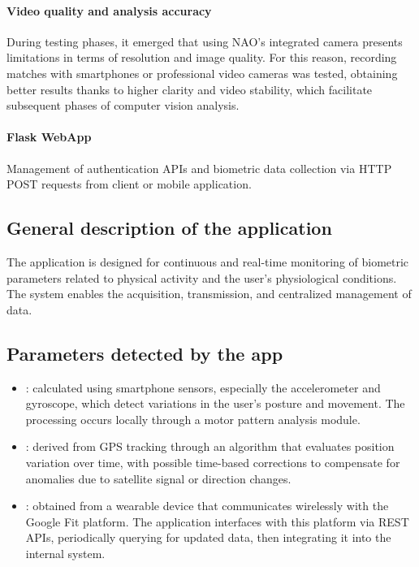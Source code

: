\documentclass{optica-article}
\begin{document}
\FloatBarrier


\paragraph{Video quality and analysis accuracy}
During testing phases, it emerged that using NAO's integrated camera presents limitations in terms of resolution and image quality. For this reason, recording matches with smartphones or professional video cameras was tested, obtaining better results thanks to higher clarity and video stability, which facilitate subsequent phases of computer vision analysis.
\FloatBarrier

\paragraph{Flask WebApp}
Management of authentication APIs and biometric data collection via HTTP POST requests from client or mobile application.

\subsection{General description of the application}
The application is designed for continuous and real-time monitoring of biometric parameters related to physical activity and the user's physiological conditions. The system enables the acquisition, transmission, and centralized management of data.

\subsection{Parameters detected by the app}
\begin{itemize}
    \item {}: calculated using smartphone sensors, especially the accelerometer and gyroscope, which detect variations in the user's posture and movement. The processing occurs locally through a motor pattern analysis module.
    \item {}: derived from GPS tracking through an algorithm that evaluates position variation over time, with possible time-based corrections to compensate for anomalies due to satellite signal or direction changes.
    \item {}: obtained from a wearable device that communicates wirelessly with the Google Fit platform. The application interfaces with this platform via REST APIs, periodically querying for updated data, then integrating it into the internal system.
\end{itemize}
\end{document}
